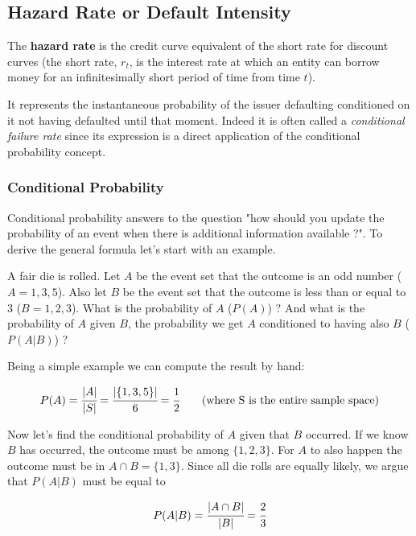 \subsection{Hazard Rate or Default Intensity}\label{hazard-rate}

The \textbf{hazard rate} is the credit curve equivalent of the short rate for discount curves (the short rate, $r_t$, is the interest rate at which an entity can borrow money for an infinitesimally short period of time from time $t$). 

It represents the instantaneous probability of the issuer defaulting conditioned on it not having defaulted until that moment. Indeed it is often called a \emph{conditional failure rate} since its expression is a direct application of the conditional probability concept.

\subsubsection{Conditional Probability}
Conditional probability answers to the question "how should you update the probability of an event when there is additional information available ?". To derive the general formula let's start with an example.

A fair die is rolled. Let \(A\) be the event set that the outcome is an odd number (\(A={1,3,5}\)). Also let \(B\) be the event set that the outcome is less than or equal to \(3\) (\(B={1,2,3}\)). What is the probability of \(A\) (\(P(A)\)) ? And what is the probability of \(A\) given \(B\), the probability we get $A$ conditioned to having also $B$ (\(P(A|B)\)) ?

Being a simple example we can compute the result by hand:

\begin{equation}
P(A) = \cfrac{|A|}{|S|} = \cfrac{|\{1,3,5\}|}{6} = \cfrac{1}{2}\qquad\textrm{(where S is the entire sample space)}
\end{equation}

Now let's find the conditional probability of \(A\) given that \(B\) occurred. If we know \(B\) has occurred, the outcome must be among \(\{1,2,3\}\). For \(A\) to also happen the outcome must be in \(A\cap B = \{1,3\}\). Since all die rolls are equally likely, we argue that \(P(A|B)\) must be equal to

\begin{equation}
P(A|B) = \cfrac{|A\cap B|}{|B|} = \cfrac{2}{3}
\end{equation}

